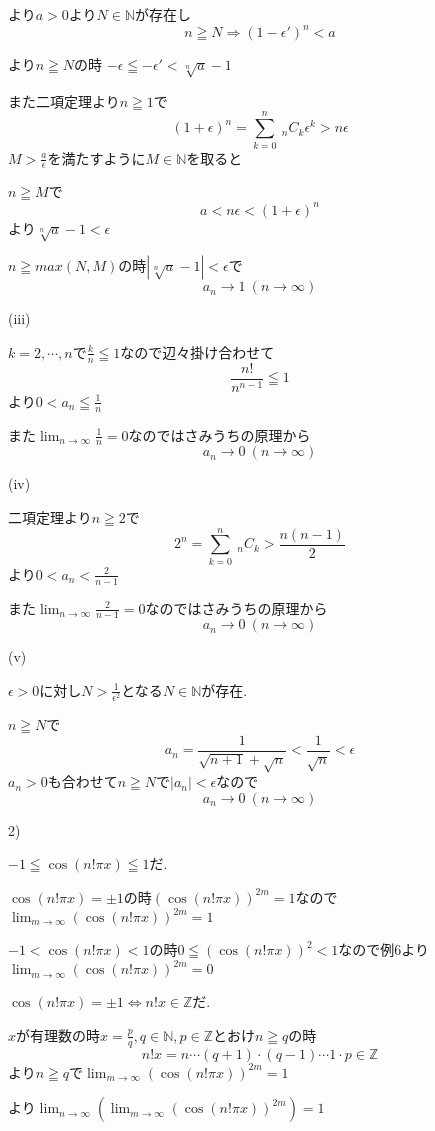 \documentclass{jsarticle}
\begin{document}
より$a>0$より$N\in\mathbb{N}$が存在し
\[n\geqq N \Rightarrow (1-\epsilon')^n < a\]

より$n\geqq N$の時
$-\epsilon \leqq -\epsilon' < \sqrt[n]{a}-1$

また二項定理より$n\geqq 1$で
\[(1+\epsilon)^n = \sum_{k=0}^n \ _nC_k  \epsilon ^k > n\epsilon\]
$M > \frac{a}{\epsilon}$を満たすように$M\in \mathbb{N}$を取ると

$n\geqq M$で
\[a < n\epsilon < (1+\epsilon)^n\]
より$\sqrt[n]{a}-1 < \epsilon$

$n\geqq max(N,M)$の時$|\sqrt[n]{a}-1| < \epsilon$で
\[a_n\to1 \ (n\to \infty)\]

(iii)

$k=2,\cdots,n$で$\frac{k}{n}\leqq 1$なので辺々掛け合わせて
\[\frac{n!}{n^{n-1}}\leqq 1\]
より$0<a_n\leqq \frac{1}{n}$

また$\displaystyle\lim_{n\to \infty}\frac{1}{n}=0$なのではさみうちの原理から
\[a_n\to 0 \ (n\to \infty)\]

(iv)

二項定理より$n\geqq 2$で
\[2^n =\sum_{k=0}^n \ _nC_k > \frac{n(n-1)}{2}\]
より$0<a_n<\frac{2}{n-1}$

また$\displaystyle\lim_{n\to \infty}\frac{2}{n-1}=0$なのではさみうちの原理から
\[a_n\to 0 \ (n\to \infty)\]

(v)

$\epsilon > 0$に対し$N>\frac{1}{\epsilon ^2}$となる$N\in \mathbb{N}$が存在.

$n\geqq N$で
\[a_n=\frac{1}{\sqrt{n+1}+\sqrt{n}}<\frac{1}{\sqrt{n}}<\epsilon\]
$a_n>0$も合わせて$n\geqq N$で$|a_n|<\epsilon$なので
\[a_n\to 0 \ (n\to \infty)\]

2)

$-1\leqq \cos(n!\pi x) \leqq 1$だ.

$\cos(n!\pi x) = \pm 1$の時$(\cos(n!\pi x))^{2m} = 1$なので$\displaystyle\lim_{m\to \infty} (\cos(n!\pi x))^{2m} = 1$

$-1<\cos(n!\pi x) < 1$の時$0 \leqq (\cos(n!\pi x))^2 < 1$なので例6より$\displaystyle \lim_{m\to \infty} (\cos(n!\pi x))^{2m} = 0$

$\cos(n!\pi x) = \pm 1\Leftrightarrow n!x \in \mathbb{Z} $だ.

$x$が有理数の時$x=\frac{p}{q},q\in \mathbb{N},p\in \mathbb{Z}$とおけ$n\geqq q$の時
\[n!x = n\cdots (q+1)\cdot (q-1) \cdots  1 \cdot p \in \mathbb{Z}\]
より$n\geqq q$で$\displaystyle\lim_{m\to \infty} (\cos(n!\pi x))^{2m} = 1$

より$\displaystyle\lim_{n\to \infty}(\lim_{m\to \infty} (\cos(n!\pi x))^{2m}) = 1$
\end{document}
